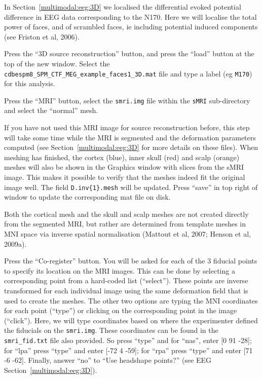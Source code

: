 In Section~\ref{multimodal:eeg:3D} we localised the differential evoked potential difference in EEG data corresponding to the N170.  Here we will localise the total power of faces, and of scrambled faces, ie including potential induced components (see Friston et al, 2006).

Press the ``3D source reconstruction'' button, and press the ``load'' button at the top of the new window. Select the \texttt{cdbespm8\_SPM\_CTF\_MEG\_example\_faces1\_3D.mat} file and type a label (eg \texttt{M170}) for this analysis.

Press the ``MRI'' button, select the \texttt{smri.img} file within the \texttt{sMRI} sub-directory and select the ``normal'' mesh.

If you have not used this MRI image for source reconstruction before, this step will take some time while the MRI is segmented and the deformation parameters computed (see Section~\ref{multimodal:eeg:3D} for more details on these files). When meshing has finished, the cortex (blue), inner skull (red) and scalp (orange) meshes will also be shown in the Graphics window with slices from the sMRI image. This makes it possible to verify that the meshes indeed fit the original image well. The field \texttt{D.inv\{1\}.mesh} will be updated. Press ``save'' in top right of window to update the corresponding mat file on disk.

Both the cortical mesh and the skull and scalp meshes are not created directly from the segmented MRI, but rather are determined from template meshes in MNI space via inverse spatial normalisation (Mattout et al, 2007; Henson et al, 2009a).

Press the ``Co-register'' button. You will be asked for each of the 3 fiducial points to specify its location on the MRI images. This can be done by selecting a corresponding point from a hard-coded list (``select''). These points are inverse transformed for each individual image using the same deformation field that is used to create the meshes. The other two options are typing the MNI coordinates for each point (``type'') or clicking on the corresponding point in the image (``click''). Here, we will type coordinates based on where the experimenter defined the fiducials on the \texttt{smri.img}. These coordinates can be found in the \texttt{smri\_fid.txt} file also provided. So press ``type'' and for ``nas'', enter [0  91  -28]; for ``lpa'' press ``type'' and enter [-72   4  -59]; for ``rpa'' press ``type'' and enter [71  -6  -62]. Finally, answer ``no'' to ``Use headshape points?'' (see EEG Section~\ref{multimodal:eeg:3D}).

